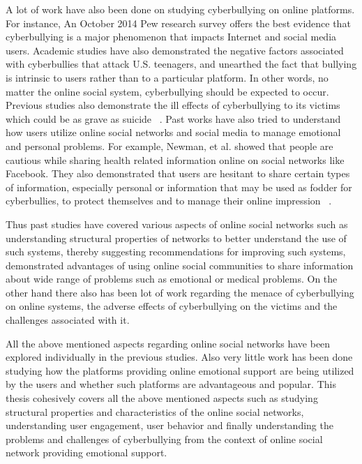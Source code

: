 A lot of work have also been done on studying cyberbullying on online platforms. For instance, An October 2014 Pew research survey offers the best evidence that cyberbullying is a major phenomenon that impacts Internet and social media users. Academic studies have also demonstrated the negative factors associated with cyberbullies that attack U.S. teenagers, and unearthed the fact that bullying is intrinsic to users rather than to a particular platform. In other words, no matter the online social system, cyberbullying should be expected to occur. Previous studies also demonstrate the ill effects of cyberbullying to its victims which could be as grave as suicide ~\cite{hosseinmardi2015detection}. Past works have also tried to understand how users utilize online social networks and social media to manage emotional and personal problems. For example, Newman, et al. showed that people are cautious while sharing health related information online on social networks like Facebook. They also demonstrated that users are hesitant to share certain types of information, especially personal or information that may be used as fodder for cyberbullies, to protect themselves and to manage their online impression ~\cite{newman2011s}. 

Thus past studies have covered various aspects of online social networks such as understanding structural properties of networks to better understand the use of such systems, thereby suggesting recommendations for improving such systems, demonstrated advantages of using online social communities to share information about wide range of problems such as emotional or medical problems. On the other hand there also has been lot of work 
regarding the menace of cyberbullying on online systems, the adverse effects of cyberbullying on the victims and the challenges associated with it. 

All the above mentioned aspects regarding online social networks have been explored individually in the previous studies. Also very little work has been done studying how the platforms providing online emotional support are being utilized by the users and whether such platforms are advantageous and popular. This thesis cohesively covers all the above mentioned aspects such as studying structural properties and characteristics of the online social networks, understanding user engagement, user behavior and finally understanding the problems and challenges of cyberbullying from the context of online social network providing emotional support. 
